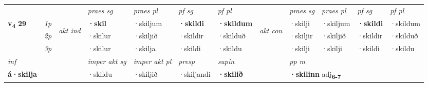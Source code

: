 \begin{longtable}[l]{X>{\footnotesize\itshape}llXXXXlXXXX}
 & &   & \textit{praes sg}  & \textit{praes pl}    & \textit{ pf sg} & \textit{pf pl} & & \textit{praes sg}  & \textit{praes pl}    & \textit{pf sg} & \textit{pf pl }  \\ \cmidrule{4-7} \cmidrule{9-12}
 \multirow{2}{*}{{{\textbf{v{\textsubscript{4}}} \Large{\textbf{29}}}}}  & 1p & \multirow{3}{*}{\begin{turn}{90}\textit{akt ind}\end{turn}} & \textbf{·skil} & ·skiljum & \textbf{·skildi} & \textbf{·skildum} & \multirow{3}{*}{\begin{turn}{90}\textit{akt con}\end{turn}} &·skilji & ·skiljum & \textbf{·skildi} & ·skildum\\*
 & 2p &  &  ·skilur  & ·skiljið & ·skildir & ·skilduð & & ·skiljir & ·skiljið & ·skildir & ·skilduð \\*
 & 3p &  & ·skilur & ·skilja & ·skildi & ·skildu & & ·skilji & ·skilji& ·skildi & ·skildu \\*
\cmidrule{4-7} \cmidrule{9-12}

   {\textit{inf}} & &  & \textit{imper akt sg} & \textit{imper akt pl}   & \textit{presp} & \textit{supin}  && \textit{pp m} \\*
  {\textbf{á\allowbreak ·skilja}} & && ·skildu  & ·skiljið   & ·skiljandi &  \textbf{·skilið}  && \multicolumn{2}{l}{\textbf{·skilinn} adj\textbf{\textsubscript{6-7}}} \\*

\midrule


\end{longtable}
